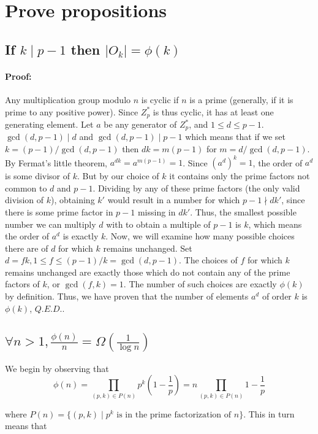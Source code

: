 \documentclass{article}
\newcommand{\z}[1]{Z^*_{#1}}
\begin{document}
\section{Prove propositions}
\subsection{If $k \mid p-1$ then $|O_k| = \phi(k)$} 
\paragraph{Proof:} Any multiplication group modulo $n$ is cyclic if $n$ is a
prime (generally, if it is prime to any positive power). Since $\z p$ is thus
cyclic, it has at least one generating element. Let $a$ be any generator of $\z
p$, and $1 \leq d \leq p-1$. $\gcd(d, p-1) \mid d$ and $\gcd(d, p-1) \mid p-1$
which means that if we set $k=(p-1)/\gcd(d,p-1)$ then $dk = m(p-1)$ for $m = d /
\gcd(d, p-1)$. By Fermat's little theorem, $a^{dk} = a^{m(p-1)} = 1$. Since
$(a^d)^k = 1$, the order of $a^d$ is some divisor of $k$. But by our choice of
$k$ it contains only the prime factors not common to $d$ and $p-1$. Dividing by
any of these prime factors (the only valid division of $k$), obtaining $k'$
would result in a number for which $p -1 \nmid dk'$, since there is some prime
factor in $p-1$ missing in $dk'$. Thus, the smallest possible number we can
multiply $d$ with to obtain a multiple of $p-1$ is $k$, which means the order of
$a^d$ is exactly $k$. Now, we will examine how many possible choices there are
of $d$ for which $k$ remains unchanged. Set $d = fk, 1 \leq f \leq (p-1)/k =
\gcd(d, p-1)$. The choices of $f$ for which $k$ remains unchanged are exactly
those which do not contain any of the prime factors of $k$, or $\gcd(f, k) = 1$.
The number of such choices are exactly $\phi(k)$ by definition. Thus, we have
proven that the number of elements $a^d$ of order $k$ is $\phi(k)$, $Q.E.D.$.

\subsection{$\forall n > 1, \frac{\phi(n)}{n} = \Omega\left( \frac{1}{\log n} \right)$}

We begin by observing that
$$\phi(n) = \prod_{(p, k) \in P(n)}p^k\left(1-\frac{1}{p}\right) = n \prod_{(p, k) \in P(n)}1-\frac{1}{p}$$

\noindent where $P(n) = \{(p,k) \mid p^k\text{ is in the prime factorization of } n\}$. This
in turn means that
\end{document}
